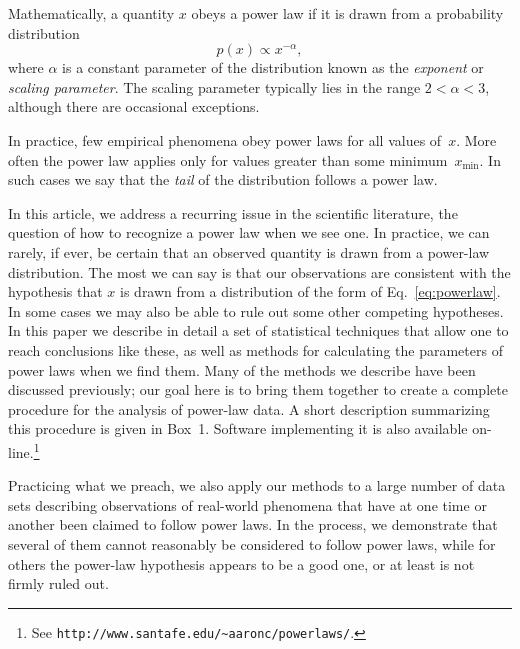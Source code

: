 \documentclass[final]{siamltex}
\newcommand{\defn}{\textit}
\newcommand{\xmin}{\ensuremath{x_{\min}}}
\begin{document}
Mathematically, a quantity $x$ obeys a power law if it is drawn from a
probability distribution
\begin{equation}
p(x) \propto x^{-\alpha},
\label{eq:powerlaw}
\end{equation}
where $\alpha$ is a constant parameter of the distribution known as the
\defn{exponent} or \defn{scaling parameter}.  The scaling parameter
typically lies in the range $2<\alpha<3$, although there are occasional
exceptions.

In practice, few empirical phenomena obey power laws for all values of~$x$.
More often the power law applies only for values greater than some
minimum~$\xmin$.  In such cases we say that the \defn{tail} of the
distribution follows a power law.

In this article, we address a recurring issue in the scientific literature,
the question of how to recognize a power law when we see one.  In practice,
we can rarely, if ever, be certain that an observed quantity is drawn from
a power-law distribution.  The most we can say is that our observations are
consistent with the hypothesis that $x$ is drawn from a distribution of the
form of Eq.~\eqref{eq:powerlaw}.  In some cases we may also be able to rule
out some other competing hypotheses.  In this paper we describe in detail a
set of statistical techniques that allow one to reach conclusions like
these, as well as methods for calculating the parameters of power laws when
we find them.  Many of the methods we describe have been discussed
previously; our goal here is to bring them together to create a complete
procedure for the analysis of power-law data.  A short description
summarizing this procedure is given in Box~1.  Software implementing it is
also available on-line.\footnote{See
 \texttt{http://www.santafe.edu/\~{}aaronc/powerlaws/}.}

Practicing what we preach, we also apply our methods to a large number of
data sets describing observations of real-world phenomena that have at one
time or another been claimed to follow power laws.  In the process, we
demonstrate that several of them cannot reasonably be considered to follow
power laws, while for others the power-law hypothesis appears to be a good
one, or at least is not firmly ruled out.
\end{document}

